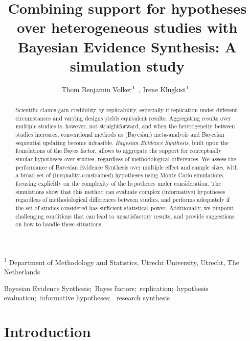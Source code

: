 \documentclass[
]{interact}
\title{Combining support for hypotheses over heterogeneous studies with
Bayesian Evidence Synthesis: A simulation study}
\author{Thom Benjamin
Volker$\textsuperscript{1}$~\orcidlink{0000-0002-2408-7820}, Irene
Klugkist$\textsuperscript{1}$~\orcidlink{0000-0001-9561-3691}}
\begin{document}
\maketitle
\textsuperscript{1} Department of Methodology and Statistics, Utrecht
University, Utrecht, The Netherlands
\begin{abstract}
Scientific claims gain credibility by replicability, especially if
replication under different circumstances and varying designs yields
equivalent results. Aggregating results over multiple studies is,
however, not straightforward, and when the heterogeneity between studies
increases, conventional methods as (Bayesian) meta-analysis and Bayesian
sequential updating become infeasible. \emph{Bayesian Evidence
Synthesis}, built upon the foundations of the Bayes factor, allows to
aggregate the support for conceptually similar hypotheses over studies,
regardless of methodological differences. We assess the performance of
Bayesian Evidence Synthesis over multiple effect and sample sizes, with
a broad set of (inequality-constrained) hypotheses using Monte Carlo
simulations, focusing explicitly on the complexity of the hypotheses
under consideration. The simulations show that this method can evaluate
complex (informative) hypotheses regardless of methodological
differences between studies, and performs adequately if the set of
studies considered has sufficient statistical power. Additionally, we
pinpoint challenging conditions that can lead to unsatisfactory results,
and provide suggestions on how to handle these situations.
\end{abstract}
\begin{keywords}
\def\sep{;\ }
Bayesian Evidence Synthesis\sep Bayes
factors\sep replication\sep hypothesis evaluation\sep informative
hypotheses\sep 
research synthesis
\end{keywords}
\ifdefined\Shaded\renewenvironment{Shaded}{\begin{tcolorbox}[sharp corners, interior hidden, frame hidden, borderline west={3pt}{0pt}{shadecolor}, breakable, enhanced, boxrule=0pt]}{\end{tcolorbox}}\fi

\doublespacing
{}

\hypertarget{introduction}{%
\section{Introduction}\label{introduction}}
\end{document}
